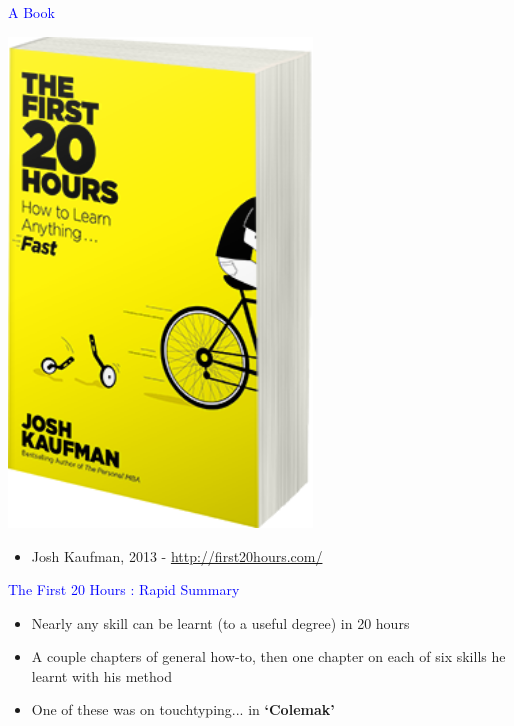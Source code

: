 \documentclass[landscape]{slides}
\begin{document}
\begin{slide}

    \textcolor{blue}{\Large{A Book}}

    \centering

    \includegraphics[height=13cm]{first20hours-cover}

    \begin{itemize}
        \item Josh Kaufman, 2013 - \url{http://first20hours.com/}
    \end{itemize}

\end{slide}


\begin{slide}

    \textcolor{blue}{\Large{The First 20 Hours : Rapid Summary}}

    \begin{itemize}
        \item Nearly any skill can be learnt (to a useful degree) in 20 hours
        \item A couple chapters of general how-to, then one chapter on each of six skills he learnt with his method
        \item One of these was on touchtyping... in \textbf{`Colemak'}
    \end{itemize}

\end{slide}
\end{document}
